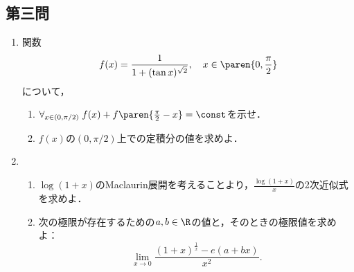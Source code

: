 \documentclass[uplatex,dvipdfmx]{jsarticle}
\begin{document}
\subsection{第三問}

\begin{tcolorbox}[colframe=ForestGreen, colback=ForestGreen!10!white,breakable,colbacktitle=ForestGreen!40!white,coltitle=black,fonttitle=\bfseries\sffamily,
    title=第３問]
    \begin{problem}\mbox{}
        \begin{enumerate}[{問}1]
            \item 関数
            \[f(x)=\frac{1}{1+(\tan x)^{\sqrt{2}}},\quad x\in\paren{0,\frac{\pi}{2}}\]
            について，
            \begin{enumerate}
                \item $\forall_{x\in(0,\pi/2)}\;f(x)+f\paren{\frac{\pi}{2}-x}=\const$を示せ．
                \item $f(x)$の$(0,\pi/2)$上での定積分の値を求めよ．
            \end{enumerate}
            \item 
            \begin{enumerate}
                \item $\log(1+x)$のMaclaurin展開を考えることより，$\frac{\log(1+x)}{x}$の2次近似式を求めよ．
                \item 次の極限が存在するための$a,b\in\R$の値と，そのときの極限値を求めよ：
                \[\lim_{x\to0}\frac{(1+x)^{\frac{1}{x}}-e(a+bx)}{x^2}.\]
            \end{enumerate}
        \end{enumerate}
    \end{problem}
\end{tcolorbox}
\end{document}
